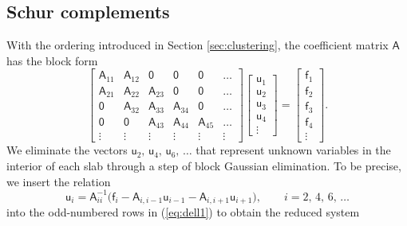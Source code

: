 \documentclass[11pt]{amsart}
\newcommand{\vct}[1]{\bm{\mathsf{#1}}}
\newcommand{\mtx}[1]{\bm{\mathsf{#1}}}
\begin{document}
\subsection{Schur complements}
With the ordering introduced in Section \ref{sec:clustering}, the
coefficient matrix $\mtx{A}$ has the block form
\begin{equation}
\label{eq:dell1}
\begin{bmatrix}
\mtx A_{11} & \mtx A_{12} & \mtx 0 & \mtx 0 & \mtx 0 & \dots \\
\mtx A_{21} & \mtx A_{22} & \mtx A_{23} & \mtx 0 &  \mtx 0 & \dots \\
\mtx 0 & \mtx A_{32} & \mtx A_{33} & \mtx A_{34} &   \mtx 0 & \dots\\
\mtx{0} & \mtx 0 & \mtx A_{43} & \mtx A_{44} & \mtx A_{45} & \dots\\
\vdots & \vdots & \vdots & \vdots & \vdots & \vdots
\end{bmatrix}
\begin{bmatrix} \mtx u_1\\\mtx u_2\\ \mtx u_3 \\ \mtx u_4 \\ \vdots \end{bmatrix} =
\begin{bmatrix} \mtx f_1\\ \mtx f_2\\ \mtx f_3\\ \mtx f_4 \\ \vdots        \end{bmatrix}.
\end{equation}
We eliminate the vectors $\vct{u}_{2},\,\vct{u}_{4},\,\vct{u}_{6},\,\dots$
that represent unknown variables in the interior of each slab through a 
step of block Gaussian elimination. To be precise, we insert the relation
\begin{equation}
\vct{u}_{i} = 
\mtx{A}_{ii}^{-1}\bigl(\vct{f}_{i} - \mtx{A}_{i,i-1}\vct{u}_{i-1} - \mtx{A}_{i,i+1}\vct{u}_{i+1}\bigr),
\qquad i = 2,\,4,\,6,\,\dots
\label{eq:usol_even}
\end{equation}
into the odd-numbered rows in (\ref{eq:dell1}) to obtain the reduced system
\end{document}
